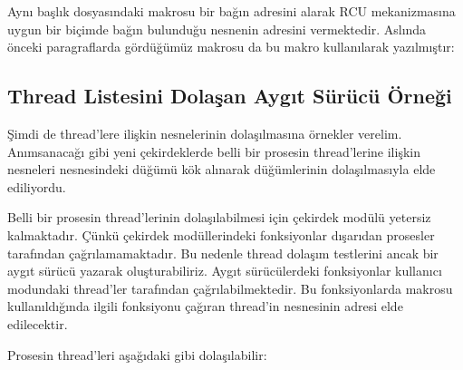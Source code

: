 \documentclass[a4paper,10pt,turkish]{sphinxmanual}
\begin{document}
\sphinxAtStartPar
Aynı başlık dosyasındaki  makrosu bir bağın adresini alarak RCU mekanizmasına uygun bir
biçimde bağın bulunduğu nesnenin adresini vermektedir. Aslında önceki paragraflarda gördüğümüz
 makrosu da bu makro kullanılarak yazılmıştır:

\begin{sphinxVerbatim}[commandchars=\\\{\}]
\end{sphinxVerbatim}


\subsection{Thread Listesini Dolaşan Aygıt Sürücü Örneği}
\label{\detokenize{processcontrolblock:thread-listesini-dolasan-aygit-surucu-ornegi}}
\sphinxAtStartPar
Şimdi de thread’lere ilişkin  nesnelerinin dolaşılmasına örnekler verelim. Anımsanacağı
gibi yeni çekirdeklerde belli bir prosesin thread’lerine ilişkin  nesneleri
 nesnesindeki  düğümü kök alınarak  düğümlerinin
dolaşılmasıyla elde ediliyordu.

\sphinxAtStartPar
Belli bir prosesin thread’lerinin dolaşılabilmesi için çekirdek modülü yetersiz kalmaktadır. Çünkü
çekirdek modüllerindeki fonksiyonlar dışarıdan prosesler tarafından çağrılamamaktadır. Bu nedenle thread
dolaşım testlerini ancak bir aygıt sürücü yazarak oluşturabiliriz. Aygıt sürücülerdeki fonksiyonlar
kullanıcı modundaki thread’ler tarafından çağrılabilmektedir. Bu fonksiyonlarda  makrosu
kullanıldığında ilgili fonksiyonu çağıran thread’in  nesnesinin adresi elde edilecektir.

\sphinxAtStartPar
Prosesin thread’leri aşağıdaki gibi dolaşılabilir:
\end{document}
